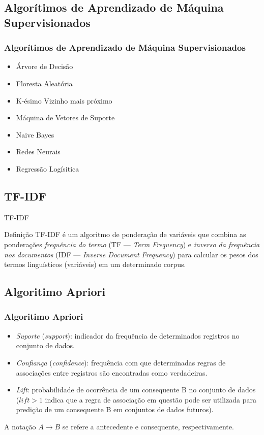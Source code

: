 \documentclass{beamer}
\begin{document}
\subsection{Algorítimos de Aprendizado de Máquina Supervisionados}
\begin{frame}
\frametitle {Algorítimos de Aprendizado de Máquina Supervisionados}
\begin{itemize}
\item Árvore de Decisão
\item Floresta Aleatória
\item K-ésimo Vizinho mais próximo
\item Máquina de Vetores de Suporte
\item Naive Bayes
\item Redes Neurais
\item Regressão Logísitica
\end{itemize}
\end{frame}
\subsection{TF-IDF}
\begin{frame}{TF-IDF}
\begin{block}{Definição}
TF-IDF é um algoritmo de ponderação de variáveis que combina as ponderações \emph{frequência do termo} (TF --- \textit{Term Frequency}) e \emph{inverso da frequência nos documentos} (IDF --- \textit{Inverse Document Frequency}) para calcular os pesos dos termos linguísticos (variáveis) em um determinado corpus.
\end{block}
\end{frame}
\subsection{Algoritimo Apriori}
\begin{frame}
\frametitle {Algoritimo Apriori}
\begin{itemize}
\item \alert{\textit{Suporte} (\textit{support})}: indicador da frequência de determinados registros no conjunto de dados.
\item \alert{\textit{Confiança} (\textit{confidence})}: frequência com que determinadas regras de associações entre registros são encontradas como verdadeiras.
\item  \alert{\textit{Lift}}: probabilidade de ocorrência de um consequente B no conjunto de dados ($lift > 1$ indica que a regra de associação em questão pode ser utilizada para predição de um consequente B em conjuntos de dados futuros).
\end{itemize}

\alert{A notação $A \rightarrow B$ se refere a antecedente e consequente, respectivamente}.
 
\end{frame}
\end{document}
